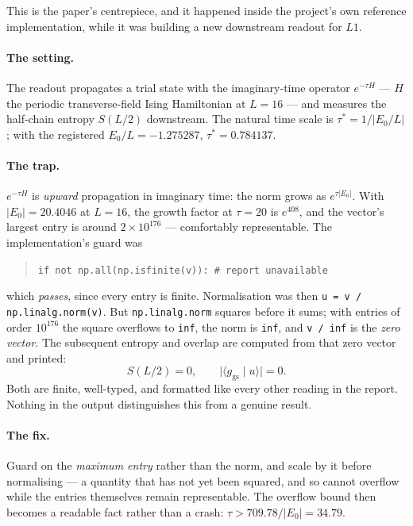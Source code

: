 \documentclass[11pt,a4paper]{article}
\newcommand{\code}[1]{\texttt{\small #1}}
\begin{document}
This is the paper's centrepiece, and it happened inside the project's own
reference implementation, while it was building a new downstream readout for
$L1$.

\paragraph{The setting.} The readout propagates a trial state with the
imaginary-time operator $e^{-\tau H}$ --- $H$ the periodic transverse-field
Ising Hamiltonian at $L{=}16$ --- and measures the half-chain entropy $S(L/2)$
downstream. The natural time scale is $\tau^\ast = 1/|E_0/L|$; with the
registered $E_0/L = -1.275287$, $\tau^\ast = 0.784137$.

\paragraph{The trap.} $e^{-\tau H}$ is \emph{upward} propagation in imaginary
time: the norm grows as $e^{\tau|E_0|}$. With $|E_0| = 20.4046$ at $L{=}16$, the
growth factor at $\tau{=}20$ is $e^{408}$, and the vector's largest entry is
around $2\times10^{176}$ --- comfortably representable. The implementation's
guard was

\begin{quote}\small
\code{if not np.all(np.isfinite(v)): \# report unavailable}
\end{quote}

\noindent which \emph{passes}, since every entry is finite. Normalisation was
then \code{u = v / np.linalg.norm(v)}. But \code{np.linalg.norm} squares before
it sums; with entries of order $10^{176}$ the square overflows to \code{inf},
the norm is \code{inf}, and \code{v / inf} is the \emph{zero vector}. The
subsequent entropy and overlap are computed from that zero vector and printed:
\[
S(L/2) = 0, \qquad \bigl|\langle g_{\mathrm{gs}} \mid u\rangle\bigr| = 0 .
\]
Both are finite, well-typed, and formatted like every other reading in the
report. Nothing in the output distinguishes this from a genuine result.

\paragraph{The fix.} Guard on the \emph{maximum entry} rather than the norm, and
scale by it before normalising --- a quantity that has not yet been squared, and
so cannot overflow while the entries themselves remain representable. The
overflow bound then becomes a readable fact rather than a crash:
$\tau > 709.78/|E_0| = 34.79$.
\end{document}
